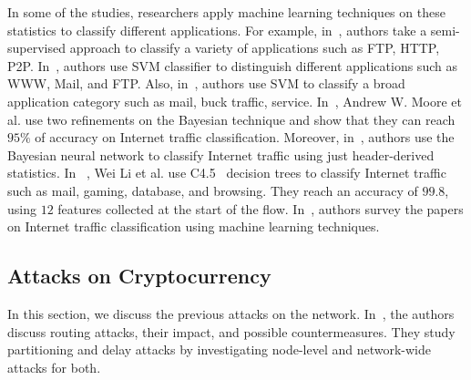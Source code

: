 In some of the studies, researchers apply machine learning techniques on these statistics to classify different applications.
For example, in~\cite{semi}, authors take a semi-supervised approach to classify a variety of applications such as FTP, HTTP, P2P. %
In~\cite{trafficClassSVM,svm2}, authors use SVM classifier to distinguish different applications such as WWW, Mail, and FTP. Also, in~\cite{svm2}, authors use SVM to classify a broad application category such as mail, buck traffic, service. %
In~\cite{MooreZ05}, Andrew W. Moore et al. use two refinements on the Bayesian technique and show that they can reach $95\%$ of accuracy on Internet traffic classification. Moreover, in~\cite{bays2}, authors use the Bayesian neural network to classify Internet traffic using just header-derived statistics. %
 In ~\cite{mlEffi}, Wei Li et al. use C4.5~\cite{tree} decision trees to classify Internet traffic such as mail, gaming, database, and browsing. They reach an accuracy of $99.8$, using $12$ features collected at the start of the flow.
  In~\cite{survey_ml,myth}, authors survey the papers on Internet traffic classification using machine learning techniques. 
 

  \subsection{Attacks on \bc Cryptocurrency}
 In this section, we discuss the previous attacks on the \bc network. 
 In~\cite{hijack}, the authors discuss routing attacks, their impact, and possible countermeasures. They study partitioning and delay attacks by investigating node-level and network-wide attacks for both. %
 
